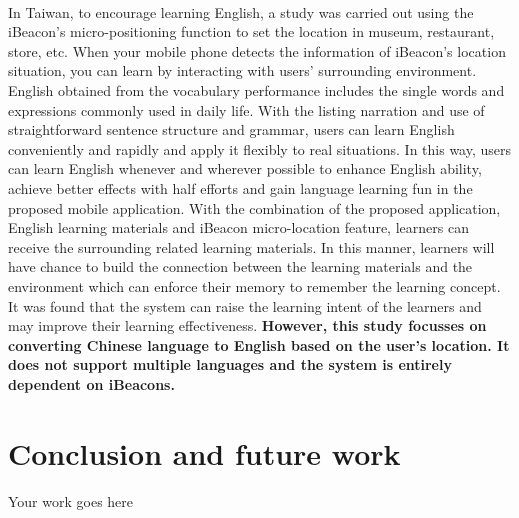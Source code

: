 \documentclass[12pt]{article}
\begin{document}
\paragraph{}In Taiwan, to encourage learning English, a study was carried out using the iBeacon's micro-positioning function to set the location in museum, restaurant, store, etc. When your mobile phone detects the information of iBeacon's location situation, you can learn by interacting with users' surrounding environment. \cite{taiwan} English obtained from the vocabulary performance includes the single words and expressions commonly used in daily life. With the listing narration and use of straightforward sentence structure and grammar, users can learn English conveniently and rapidly and apply it flexibly to real situations. In this way, users can learn English whenever and wherever possible to enhance English ability, achieve better effects with half efforts and gain language learning fun in the proposed mobile application. With the combination of the proposed application, English learning materials and iBeacon micro-location feature, learners can receive the surrounding related learning materials. In this manner, learners will have chance to build the connection between the learning materials and the environment which can enforce their memory to remember the learning concept.  \cite{taiwan} It was found that the system can raise the learning intent of the learners and may improve their learning effectiveness. \textbf{However, this study focusses on converting Chinese language to English based on the user's location. It does not support multiple languages and the system is entirely dependent on iBeacons.}


\section{Conclusion and future work}
\label{sect-conclusion}
Your work goes here

\cleardoublepage
{}


\end{document}

